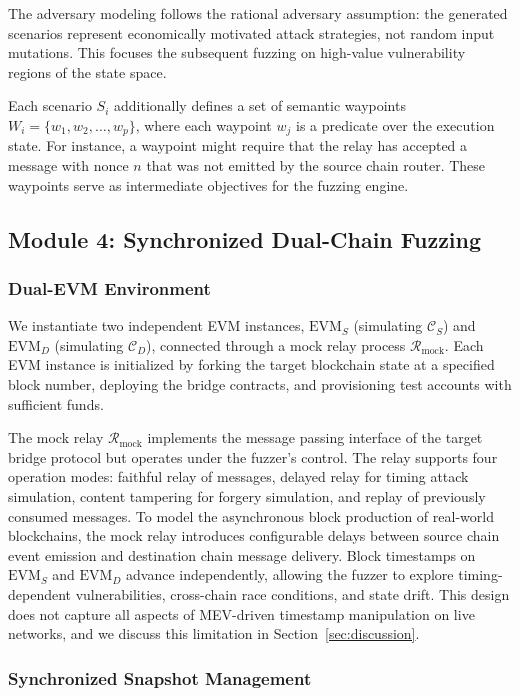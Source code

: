 \documentclass[journal]{IEEEtran}
\begin{document}
The adversary modeling follows the rational adversary assumption: the generated scenarios represent economically motivated attack strategies, not random input mutations. This focuses the subsequent fuzzing on high-value vulnerability regions of the state space.

Each scenario $S_i$ additionally defines a set of semantic waypoints $W_i = \{w_1, w_2, \ldots, w_p\}$, where each waypoint $w_j$ is a predicate over the execution state. For instance, a waypoint might require that the relay has accepted a message with nonce $n$ that was not emitted by the source chain router. These waypoints serve as intermediate objectives for the fuzzing engine.

\subsection{Module 4: Synchronized Dual-Chain Fuzzing}

\subsubsection{Dual-EVM Environment}

We instantiate two independent EVM instances, $\text{EVM}_S$ (simulating $\mathcal{C}_S$) and $\text{EVM}_D$ (simulating $\mathcal{C}_D$), connected through a mock relay process $\mathcal{R}_{\text{mock}}$. Each EVM instance is initialized by forking the target blockchain state at a specified block number, deploying the bridge contracts, and provisioning test accounts with sufficient funds.

The mock relay $\mathcal{R}_{\text{mock}}$ implements the message passing interface of the target bridge protocol but operates under the fuzzer's control. The relay supports four operation modes: faithful relay of messages, delayed relay for timing attack simulation, content tampering for forgery simulation, and replay of previously consumed messages. To model the asynchronous block production of real-world blockchains, the mock relay introduces configurable delays between source chain event emission and destination chain message delivery. Block timestamps on $\text{EVM}_S$ and $\text{EVM}_D$ advance independently, allowing the fuzzer to explore timing-dependent vulnerabilities, cross-chain race conditions, and state drift. This design does not capture all aspects of MEV-driven timestamp manipulation on live networks, and we discuss this limitation in Section~\ref{sec:discussion}.

\subsubsection{Synchronized Snapshot Management}
\end{document}
